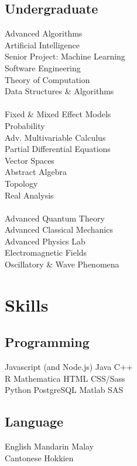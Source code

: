 \documentclass{deedy-resume-openfont}
\begin{document}
\begin{minipage}[t]{0.33\textwidth}
\subsection{Undergraduate}
Advanced Algorithms \\
Artificial Intelligence \\
Senior Project: Machine Learning \\
Software Engineering \\
Theory of Computation \\
Data Structures \& Algorithms \\
\ \\
Fixed \& Mixed Effect Models \\
Probability \\
Adv. Multivariable Calculus \\
Partial Differential Equations \\
Vector Spaces \\
Abstract Algebra \\
Topology \\
Real Analysis \\
\ \\
Advanced Quantum Theory \\
Advanced Classical Mechanics \\
Advanced Physics Lab \\
Electromagnetic Fields \\
Oscillatory \& Wave Phenomena \\

\sectionsep


\section{Skills}
\subsection{Programming}
Javascript (and Node.js) \textbullet{} Java \textbullet{} C++ \\
R \textbullet{} Mathematica \textbullet{} HTML \textbullet{} CSS/Sass \\ 

Python \textbullet{} PostgreSQL \textbullet{} Matlab \textbullet{} SAS \\
\sectionsep

\subsection{Language}
English \textbullet{} Mandarin \textbullet{} Malay \\ 
Cantonese \textbullet{} Hokkien
\sectionsep

%
%

\end{minipage} 
\end{document}
